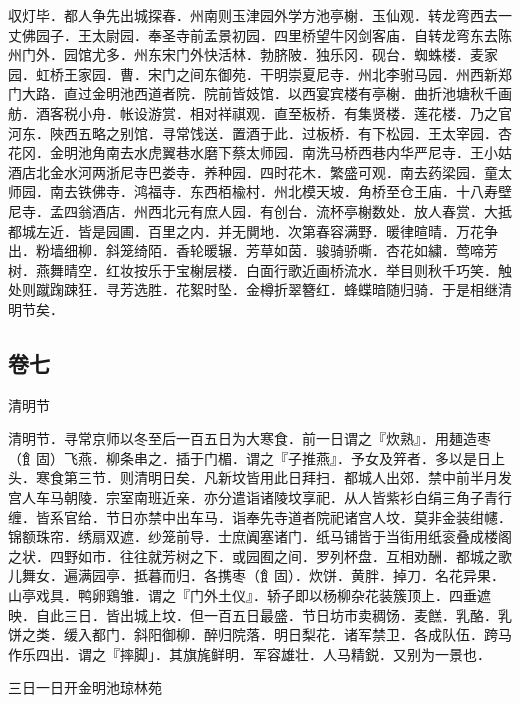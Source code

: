 \documentclass[]{article}
\begin{document}
収灯毕．都人争先出城探春．州南则玉津园外学方池亭榭．玉仙观．转龙弯西去一丈佛园子．王太尉园．奉圣寺前孟景初园．四里桥望牛冈剑客庙．自转龙弯东去陈州门外．园馆尤多．州东宋门外快活林．勃脐陂．独乐冈．砚台．蜘蛛楼．麦家园．虹桥王家园．曹．宋门之间东御苑．干明崇夏尼寺．州北李驸马园．州西新郑门大路．直过金明池西道者院．院前皆妓馆．以西宴宾楼有亭榭．曲折池塘秋千画舫．酒客税小舟．帐设游赏．相对祥祺观．直至板桥．有集贤楼．莲花楼．乃之官河东．陜西五略之别馆．寻常饯送．置酒于此．过板桥．有下松园．王太宰园．杏花冈．金明池角南去水虎翼巷水磨下蔡太师园．南洗马桥西巷内华严尼寺．王小姑酒店北金水河两浙尼寺巴娄寺．养种园．四时花木．繁盛可观．南去药梁园．童太师园．南去铁佛寺．鸿福寺．东西栢楡村．州北模天坡．角桥至仓王庙．十八寿壁尼寺．孟四翁酒店．州西北元有庶人园．有创台．流杯亭榭数处．放人春赏．大抵都城左近．皆是园圃．百里之内．并无閴地．次第春容满野．暖律暄晴．万花争出．粉墙细柳．斜笼绮陌．香轮暖辗．芳草如茵．骏骑骄嘶．杏花如繍．莺啼芳树．燕舞晴空．红妆按乐于宝榭层楼．白面行歌近画桥流水．举目则秋千巧笑．触处则蹴踘踈狂．寻芳选胜．花絮时坠．金樽折翠簪红．蜂蝶暗随归骑．于是相继清明节矣．

\hypertarget{header-n130}{%
\subsection{卷七}\label{header-n130}}

清明节

清明节．寻常京师以冬至后一百五日为大寒食．前一日谓之『炊熟』．用麺造枣（飠固）飞燕．柳条串之．插于门楣．谓之『子推燕』．予女及笄者．多以是日上头．寒食第三节．则清明日矣．凡新坟皆用此日拜扫．都城人出郊．禁中前半月发宫人车马朝陵．宗室南班近亲．亦分遣诣诸陵坟享祀．从人皆紫衫白绢三角子青行缠．皆系官给．节日亦禁中出车马．诣奉先寺道者院祀诸宫人坟．莫非金装绀幰．锦额珠帘．绣扇双遮．纱笼前导．士庶阗塞诸门．纸马铺皆于当街用纸衮叠成楼阁之状．四野如市．往往就芳树之下．或园囿之间．罗列杯盘．互相劝酬．都城之歌儿舞女．遍满园亭．抵暮而归．各携枣（飠固）．炊饼．黄胖．掉刀．名花异果．山亭戏具．鸭卵鶏雏．谓之『门外土仪』．轿子即以杨柳杂花装簇顶上．四垂遮映．自此三日．皆出城上坟．但一百五日最盛．节日坊市卖稠饧．麦餻．乳酪．乳饼之类．缓入都门．斜阳御柳．醉归院落．明日梨花．诸军禁卫．各成队伍．跨马作乐四出．谓之『摔脚」．其旗旄鲜明．军容雄壮．人马精鋭．又别为一景也．

三日一日开金明池琼林苑
\end{document}
